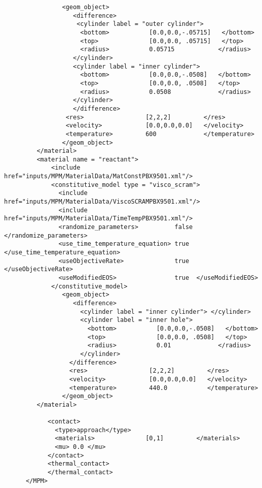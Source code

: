 \begin{verbatim}
                <geom_object>
                   <difference>
                    <cylinder label = "outer cylinder">
                     <bottom>           [0.0,0.0,-.05715]   </bottom>
                     <top>              [0.0,0.0, .05715]   </top>
                     <radius>           0.05715            </radius>
                   </cylinder>
                   <cylinder label = "inner cylinder">
                     <bottom>           [0.0,0.0,-.0508]   </bottom>
                     <top>              [0.0,0.0, .0508]   </top>
                     <radius>           0.0508             </radius>
                   </cylinder>
                   </difference>
                 <res>                 [2,2,2]         </res>
                 <velocity>            [0.0,0.0,0.0]   </velocity>
                 <temperature>         600             </temperature>
                </geom_object>
         </material>
         <material name = "reactant">
             <include href="inputs/MPM/MaterialData/MatConstPBX9501.xml"/>
             <constitutive_model type = "visco_scram">
               <include href="inputs/MPM/MaterialData/ViscoSCRAMPBX9501.xml"/>
               <include href="inputs/MPM/MaterialData/TimeTempPBX9501.xml"/>
               <randomize_parameters>          false </randomize_parameters>
               <use_time_temperature_equation> true  </use_time_temperature_equation>
               <useObjectiveRate>              true  </useObjectiveRate>
               <useModifiedEOS>                true  </useModifiedEOS>
             </constitutive_model>
                <geom_object>
                   <difference>
                     <cylinder label = "inner cylinder"> </cylinder>
                     <cylinder label = "inner hole">
                       <bottom>           [0.0,0.0,-.0508]   </bottom>
                       <top>              [0.0,0.0, .0508]   </top>
                       <radius>           0.01             </radius>
                     </cylinder>
                  </difference>
                  <res>                 [2,2,2]         </res>
                  <velocity>            [0.0,0.0,0.0]   </velocity>
                  <temperature>         440.0           </temperature>
                </geom_object>
         </material>

            <contact>
              <type>approach</type>
              <materials>              [0,1]         </materials>
              <mu> 0.0 </mu>
            </contact>
            <thermal_contact>
            </thermal_contact>
      </MPM>


\end{verbatim}

